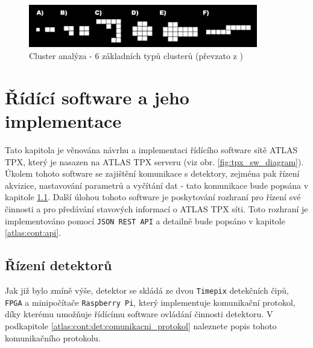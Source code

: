\begin{figure}[t]
	\begin{center}
		\includegraphics[width=10cm]{figures/ca.png}
		\caption{Cluster analýza - 6 základních typů clusterů (převzato z \cite{TurecekThesis2011})}
		\label{fig:tpx_ca}
	\end{center}
\end{figure}


\section{Řídící software a jeho implementace}\label{atlas:cont}
Tato kapitola je věnována návrhu a implementaci řídícího software sítě ATLAS TPX, který je nasazen na ATLAS TPX serveru (viz obr. \ref{fig:tpx_sw_diagram}). Úkolem  tohoto software se zajištění komunikace s detektory, zejména pak řízení akvizice, nastavování parametrů a vyčítání dat - tato komunikace bude popsána v kapitole \ref{atlas:cont:det}. Další úlohou tohoto software je poskytování rozhraní pro řízení své činnosti a pro předávání stavových informací o ATLAS TPX síti. Toto rozhraní je implementováno pomocí \texttt{JSON REST API} a detailně bude popsáno v kapitole \ref{atlas:cont:api}. \todo

\subsection{Řízení detektorů}\label{atlas:cont:det} %
Jak již bylo zmíně výše, detektor se skládá ze dvou \texttt{Timepix} detekčních čipů, \texttt{FPGA} a minipočítače \texttt{Raspberry Pi}, který implementuje komunikační protokol, díky kterému umožňuje řídícímu software ovládání činnosti detektoru. V podkapitole \ref{atlas:cont:det:comunikacni_protokol} naleznete popis tohoto komunikačního protokolu.

